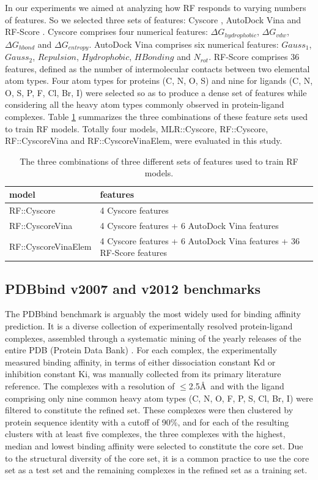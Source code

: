 In our experiments we aimed at analyzing how RF responds to varying numbers of features. So we selected three sets of features: Cyscore \citep{1372}, AutoDock Vina \citep{595} and RF-Score \citep{564}. Cyscore comprises four numerical features: $\Delta G_{hydrophobic}$, $\Delta G_{vdw}$, $\Delta G_{hbond}$ and $\Delta G_{entropy}$. AutoDock Vina comprises six numerical features: $Gauss_1$, $Gauss_2$, $Repulsion$, $Hydrophobic$, $HBonding$ and $N_{rot}$. RF-Score comprises 36 features, defined as the number of intermolecular contacts between two elemental atom types. Four atom types for proteins (C, N, O, S) and nine for ligands (C, N, O, S, P, F, Cl, Br, I) were selected so as to produce a dense set of features while considering all the heavy atom types commonly observed in protein-ligand complexes. Table \ref{rfcyscore:features} summarizes the three combinations of these feature sets used to train RF models. Totally four models, MLR::Cyscore, RF::Cyscore, RF::CyscoreVina and RF::CyscoreVinaElem, were evaluated in this study.

\begin{table}
\caption{The three combinations of three different sets of features used to train RF models.}
\label{rfcyscore:features}
\begin{tabular}{ll}
\hline
model & features\\
\hline
RF::Cyscore         & 4 Cyscore features\\
RF::CyscoreVina     & 4 Cyscore features + 6 AutoDock Vina features\\
RF::CyscoreVinaElem & 4 Cyscore features + 6 AutoDock Vina features + 36 RF-Score features\\
\hline
\end{tabular}
\end{table}

\subsection{PDBbind v2007 and v2012 benchmarks}

The PDBbind \citep{529,530} benchmark is arguably the most widely used for binding affinity prediction. It is a diverse collection of experimentally resolved protein-ligand complexes, assembled through a systematic mining of the yearly releases of the entire PDB (Protein Data Bank) \citep{540,537}. For each complex, the experimentally measured binding affinity, in terms of either dissociation constant Kd or inhibition constant Ki, was manually collected from its primary literature reference. The complexes with a resolution of $\le$2.5\AA\ and with the ligand comprising only nine common heavy atom types (C, N, O, F, P, S, Cl, Br, I) were filtered to constitute the refined set. These complexes were then clustered by protein sequence identity with a cutoff of 90\%, and for each of the resulting clusters with at least five complexes, the three complexes with the highest, median and lowest binding affinity were selected to constitute the core set. Due to the structural diversity of the core set, it is a common practice to use the core set as a test set and the remaining complexes in the refined set as a training set.

